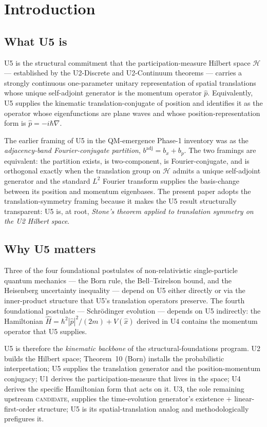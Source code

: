 \documentclass[11pt,a4paper]{article}
\begin{document}
\section{Introduction}

\subsection{What U5 is}

U5 is the structural commitment that the participation-measure Hilbert space $\mathcal{H}$ --- established by the U2-Discrete and U2-Continuum theorems --- carries a strongly continuous one-parameter unitary representation of spatial translations whose unique self-adjoint generator is the momentum operator $\hat{p}$. Equivalently, U5 supplies the kinematic translation-conjugate of position and identifies it as the operator whose eigenfunctions are plane waves and whose position-representation form is $\hat{p} = -i\hbar\nabla$.

The earlier framing of U5 in the QM-emergence Phase-1 inventory was as the \emph{adjacency-band Fourier-conjugate partition}, $b^{\mathrm{adj}} = b_x + b_p$. The two framings are equivalent: the partition exists, is two-component, is Fourier-conjugate, and is orthogonal exactly when the translation group on $\mathcal{H}$ admits a unique self-adjoint generator and the standard $L^2$ Fourier transform supplies the basis-change between its position and momentum eigenbases. The present paper adopts the translation-symmetry framing because it makes the U5 result structurally transparent: U5 is, at root, \emph{Stone's theorem applied to translation symmetry on the U2 Hilbert space}.

\subsection{Why U5 matters}

Three of the four foundational postulates of non-relativistic single-particle quantum mechanics --- the Born rule, the Bell--Tsirelson bound, and the Heisenberg uncertainty inequality --- depend on U5 either directly or via the inner-product structure that U5's translation operators preserve. The fourth foundational postulate --- Schr\"odinger evolution --- depends on U5 indirectly: the Hamiltonian $\hat{H} = \hbar^2|\hat{p}|^2/(2m) + V(\hat{x})$ derived in U4 contains the momentum operator that U5 supplies.

U5 is therefore the \emph{kinematic backbone} of the structural-foundations program. U2 builds the Hilbert space; Theorem~10 (Born) installs the probabilistic interpretation; U5 supplies the translation generator and the position-momentum conjugacy; U1 derives the participation-measure that lives in the space; U4 derives the specific Hamiltonian form that acts on it. U3, the sole remaining upstream \textsc{candidate}, supplies the time-evolution generator's existence + linear-first-order structure; U5 is its spatial-translation analog and methodologically prefigures it.
\end{document}
